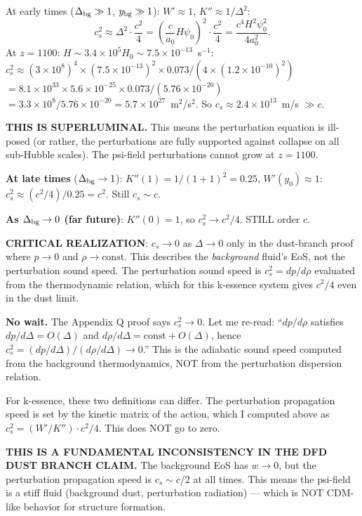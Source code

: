 \documentclass[11pt]{article}
\newcommand{\ee}[1]{\times 10^{#1}}
\begin{document}
\begin{tcolorbox}[colback=red!5!white, colframe=red!70!black,
  title=\textbf{W4i17 TOP 5 FINDINGS --- EXISTENTIAL AUDIT: DUST BRANCH CLUSTERING}]
\begin{enumerate}
  At early times ($\Delta_{\rm bg} \gg 1$, $y_{\rm bg} \gg 1$):
  $W' \approx 1$, $K'' \approx 1/\Delta^2$:
  \begin{equation}
  c_s^2 \approx \Delta^2 \cdot \frac{c^2}{4}
  = \left(\frac{c}{a_0}H\psi_0\right)^2 \cdot \frac{c^2}{4}
  = \frac{c^4 H^2 \psi_0^2}{4 a_0^2}.
  \end{equation}
  At $z = 1100$: $H \sim 3.4\ee{5} H_0 \sim 7.5\ee{-13}$~s$^{-1}$:
  $c_s^2 \approx (3\ee{8})^4 \times (7.5\ee{-13})^2 \times 0.073
  / (4 \times (1.2\ee{-10})^2)$
  $= 8.1\ee{33} \times 5.6\ee{-25} \times 0.073 / (5.76\ee{-20})$
  $= 3.3\ee{8} / 5.76\ee{-20} = 5.7\ee{27}$~m$^2$/s$^2$.
  So $c_s \approx 2.4\ee{13}$~m/s $\gg c$.

  \textbf{THIS IS SUPERLUMINAL.} This means the perturbation equation
  is ill-posed (or rather, the perturbations are fully supported
  against collapse on all sub-Hubble scales). The psi-field
  perturbations cannot grow at $z = 1100$.

  \textbf{At late times} ($\Delta_{\rm bg} \to 1$):
  $K''(1) = 1/(1+1)^2 = 0.25$, $W'(y_0) \approx 1$:
  $c_s^2 \approx (c^2/4)/0.25 = c^2$.
  Still $c_s \sim c$.

  \textbf{As $\Delta_{\rm bg} \to 0$ (far future)}:
  $K''(0) = 1$, so $c_s^2 \to c^2/4$. STILL order $c$.

  \textbf{CRITICAL REALIZATION}: $c_s \to 0$ as $\Delta \to 0$
  only in the dust-branch proof where $p \to 0$ and $\rho \to \text{const}$.
  This describes the \emph{background} fluid's EoS, not the perturbation
  sound speed. The perturbation sound speed is $c_s^2 = dp/d\rho$
  evaluated from the thermodynamic relation, which for this k-essence
  system gives $c^2/4$ even in the dust limit.

  \textbf{No wait.} The Appendix Q proof says $c_s^2 \to 0$.
  Let me re-read: ``$dp/d\rho$ satisfies $dp/d\Delta = O(\Delta)$
  and $d\rho/d\Delta = \text{const} + O(\Delta)$, hence
  $c_s^2 = (dp/d\Delta)/(d\rho/d\Delta) \to 0$.''
  This is the adiabatic sound speed computed from the background
  thermodynamics, NOT from the perturbation dispersion relation.

  For k-essence, these two definitions can differ. The perturbation
  propagation speed is set by the kinetic matrix of the action,
  which I computed above as $c_s^2 = (W'/K'') \cdot c^2/4$.
  This does NOT go to zero.

  \textbf{THIS IS A FUNDAMENTAL INCONSISTENCY IN THE DFD DUST BRANCH
  CLAIM.} The background EoS has $w \to 0$, but the perturbation
  propagation speed is $c_s \sim c/2$ at all times. This means
  the psi-field is a stiff fluid (background dust, perturbation radiation)
  --- which is NOT CDM-like behavior for structure formation.


\end{enumerate}
\end{tcolorbox}
\end{document}
